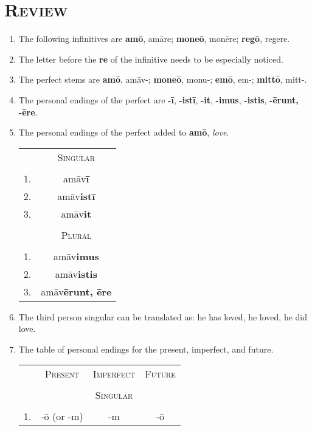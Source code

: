 \documentclass[12pt]{article}
\begin{document}
\section{\textsc{Review}}
\begin{enumerate}[1.]
	\item The following infinitives are \textbf{amō}, amāre; \textbf{moneō}, monēre; \textbf{regō}, regere.
	\item The letter before the \textbf{re} of the infinitive needs to be especially noticed.
	\item  The perfect stems are \textbf{amō}, amāv-; \textbf{moneō}, monu-; \textbf{emō}, em-; \textbf{mittō}, mitt-.
	\item The personal endings of the perfect are \textbf{-ī}, \textbf{-istī}, \textbf{-it}, \textbf{-imus}, \textbf{-istis}, \textbf{-ērunt, -ēre}.
	\item The personal endings of the perfect added to \textbf{amō}, \textit{love}.
	\begin{center}
		\begin{tabular}{ c c }
		& \textsc{Singular} \\
		& \\
		\textsc{1}. & amāv\textbf{ī} \\
		\textsc{2}. & amāv\textbf{istī} \\
		\textsc{3}. & amāv\textbf{it} \\
		& \\
		& \textsc{Plural} \\
		& \\
		\textsc{1}. & amāv\textbf{imus} \\
		\textsc{2}. & amāv\textbf{istis} \\
		\textsc{3}. & amāv\textbf{ērunt, ēre}
		\end{tabular}
	\end{center}
	\item The third person singular can be translated as: he has loved, he loved, he did love.
	\item The table of personal endings for the present, imperfect, and future.
	\begin{center}
		\begin{tabular}{ c c c c }
		& \textsc{Present} & \textsc{Imperfect} & \textsc{Future} \\
		& & & \\
		& & \textsc{Singular} & \\
		& & & \\
		\textsc{1}. & -ō (or -m) & -m & -ō \\

\end{tabular}
\end{center}
\end{enumerate}
\end{document}
